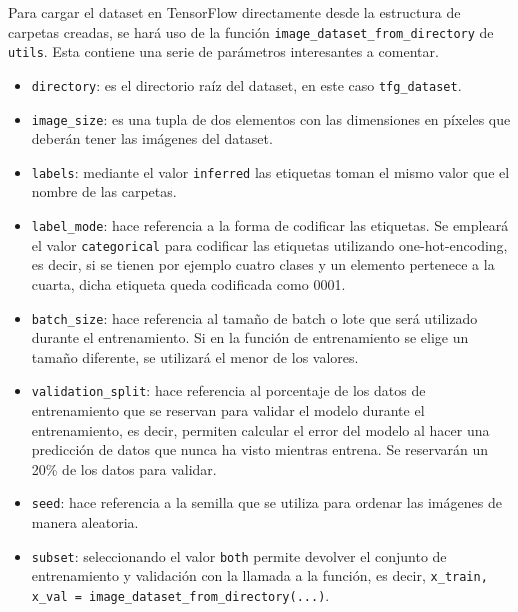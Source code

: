 			Para cargar el dataset en TensorFlow directamente desde la estructura de carpetas creadas, se hará uso de la función \texttt{image\_dataset\_from\_directory} de \texttt{utils}. Esta contiene una serie de parámetros interesantes a comentar. 
			
			\begin{itemize}
				\item \texttt{directory}: es el directorio raíz del dataset, en este caso \texttt{tfg\_dataset}. 
				\item \texttt{image\_size}: es una tupla de dos elementos con las dimensiones en píxeles que deberán tener las imágenes del dataset. 
				\item \texttt{labels}: mediante el valor \texttt{inferred} las etiquetas toman el mismo valor que el nombre de las carpetas. 
				\item \texttt{label\_mode}: hace referencia a la forma de codificar las etiquetas. Se empleará el valor \texttt{categorical} para codificar las etiquetas utilizando one-hot-encoding, es decir, si se tienen por ejemplo cuatro clases y un elemento pertenece a la cuarta, dicha etiqueta queda codificada como 0001. 
				\item \texttt{batch\_size}: hace referencia al tamaño de batch o lote que será utilizado durante el entrenamiento. Si en la función de entrenamiento se elige un tamaño diferente, se utilizará el menor de los valores. 
				\item \texttt{validation\_split}: hace referencia al porcentaje de los datos de entrenamiento que se reservan para validar el modelo durante el entrenamiento, es decir, permiten calcular el error del modelo al hacer una predicción de datos que nunca ha visto mientras entrena. Se reservarán un 20\% de los datos para validar. 
				\item \texttt{seed}: hace referencia a la semilla que se utiliza para ordenar las imágenes de manera aleatoria. 
				\item \texttt{subset}: seleccionando el valor \texttt{both} permite devolver el conjunto de entrenamiento y validación con la llamada a la función, es decir, \texttt{x\_train, x\_val = image\_dataset\_from\_directory(...)}. 
			\end{itemize}
			
